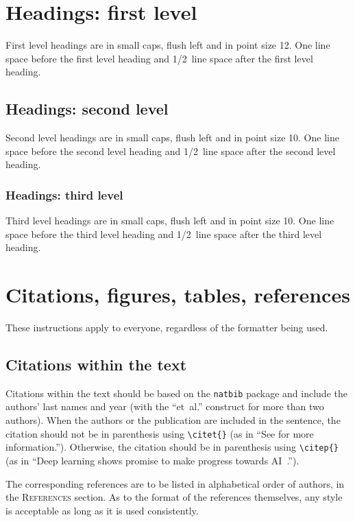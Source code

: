 \documentclass{article} %
\begin{document}
\section{Headings: first level}
\label{headings}

First level headings are in small caps,
flush left and in point size 12. One line space before the first level
heading and 1/2~line space after the first level heading.

\subsection{Headings: second level}

Second level headings are in small caps,
flush left and in point size 10. One line space before the second level
heading and 1/2~line space after the second level heading.

\subsubsection{Headings: third level}

Third level headings are in small caps,
flush left and in point size 10. One line space before the third level
heading and 1/2~line space after the third level heading.

\section{Citations, figures, tables, references}
\label{others}

These instructions apply to everyone, regardless of the formatter being used.

\subsection{Citations within the text}

Citations within the text should be based on the \texttt{natbib} package
and include the authors' last names and year (with the ``et~al.'' construct
for more than two authors). When the authors or the publication are
included in the sentence, the citation should not be in parenthesis using \verb|\citet{}| (as
in ``See \citet{Hinton06} for more information.''). Otherwise, the citation
should be in parenthesis using \verb|\citep{}| (as in ``Deep learning shows promise to make progress
towards AI~\citep{Bengio+chapter2007}.'').

The corresponding references are to be listed in alphabetical order of
authors, in the \textsc{References} section. As to the format of the
references themselves, any style is acceptable as long as it is used
consistently.
\end{document}
